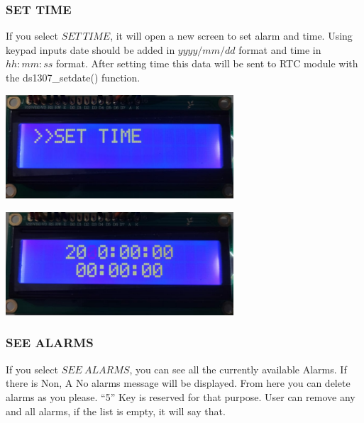 \subsubsection{SET TIME} 
If you select $SET\:TIME$, it will open a new screen to set alarm and time. Using keypad inputs date should be added in $yyyy/mm/dd$ format and time in $hh:mm:ss$ format. After setting time this data will be sent to RTC module with the ds1307\_setdate() function.

\begin{center}
  \includegraphics[width=8.5cm]{LCD Images/LCD 6.jpg}
  
  \includegraphics[width=8.5cm]{LCD Images/LCD 7.jpg}
\end{center}
\newpage
\subsubsection{SEE ALARMS} 
If you select $SEE \: ALARMS$, you can see all the currently available Alarms. If there is Non, A No alarms message will be displayed. From here you can delete alarms as you please. “5” Key is reserved for that purpose. User can remove any and all alarms, if the list is empty, it will say that.


